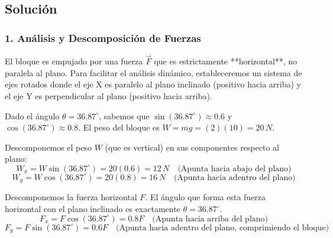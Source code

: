 \documentclass[12pt, a4paper]{article}
\begin{document}
\begin{center}
\end{center}

\subsection*{Solución}

\subsubsection*{1. Análisis y Descomposición de Fuerzas}
El bloque es empujado por una fuerza $\vec{F}$ que es estrictamente **horizontal**, no paralela al plano. Para facilitar el análisis dinámico, estableceremos un sistema de ejes rotados donde el eje X es paralelo al plano inclinado (positivo hacia arriba) y el eje Y es perpendicular al plano (positivo hacia arriba).

Dado el ángulo $\theta = 36.87^\circ$, sabemos que $\sin(36.87^\circ) \approx 0.6$ y $\cos(36.87^\circ) \approx 0.8$.
El peso del bloque es $W = mg = (2)(10) = 20 \, \si{N}$.

Descomponemos el peso $W$ (que es vertical) en sus componentes respecto al plano:
$$ W_x = W \sin(36.87^\circ) = 20(0.6) = 12 \, \si{N} \quad \text{(Apunta hacia abajo del plano)} $$
$$ W_y = W \cos(36.87^\circ) = 20(0.8) = 16 \, \si{N} \quad \text{(Apunta hacia adentro del plano)} $$

Descomponemos la fuerza horizontal $F$. El ángulo que forma esta fuerza horizontal con el plano inclinado es exactamente $\theta = 36.87^\circ$.
$$ F_x = F \cos(36.87^\circ) = 0.8 F \quad \text{(Apunta hacia arriba del plano)} $$
$$ F_y = F \sin(36.87^\circ) = 0.6 F \quad \text{(Apunta hacia adentro del plano, comprimiendo el bloque)} $$
\end{document}
